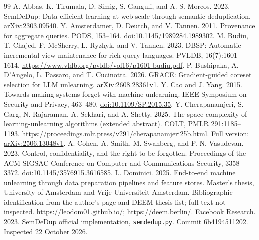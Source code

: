 \begin{thebibliography}{99}
 A. Abbas, K. Tirumala, D. Simig, S. Ganguli, and A. S.
Morcos. 2023. SemDeDup: Data-efficient learning at web-scale through
semantic deduplication. \href{https://arxiv.org/abs/2303.09540}{arXiv:2303.09540}.
 Y. Amsterdamer, D. Deutch, and V. Tannen. 2011.
Provenance for aggregate queries. PODS, 153--164.
\href{https://doi.org/10.1145/1989284.1989302}{doi:10.1145/1989284.1989302}.
 M. Budiu, T. Chajed, F. McSherry, L. Ryzhyk, and V. Tannen.
2023. DBSP: Automatic incremental view maintenance for rich query
languages. PVLDB, 16(7):1601--1614.
\url{https://www.vldb.org/pvldb/vol16/p1601-budiu.pdf}.
 P. Bushipaka, A. D'Angelo, L. Passaro, and T. Cucinotta.
2026. GRACE: Gradient-guided coreset selection for LLM unlearning.
\href{https://arxiv.org/abs/2608.28361v1}{arXiv:2608.28361v1}.
 Y. Cao and J. Yang. 2015.
Towards making systems forget with machine unlearning.
IEEE Symposium on Security and Privacy, 463--480.
\href{https://doi.org/10.1109/SP.2015.35}{doi:10.1109/SP.2015.35}.
 Y. Cherapanamjeri, S. Garg, N. Rajaraman, A. Sekhari,
and A. Shetty. 2025. The space complexity of learning-unlearning
algorithms (extended abstract). COLT, PMLR 291:1185--1193.
\url{https://proceedings.mlr.press/v291/cherapanamjeri25b.html}.
Full version: \href{https://arxiv.org/abs/2506.13048v1}{arXiv:2506.13048v1}.
 A. Cohen, A. Smith, M. Swanberg,
and P. N. Vasudevan. 2023. Control, confidentiality, and the right to be forgotten.
Proceedings of the ACM SIGSAC Conference on Computer and Communications Security,
3358--3372. \href{https://doi.org/10.1145/3576915.3616585}{doi:10.1145/3576915.3616585}.
 L. Dominici. 2025. End-to-end machine unlearning through
data preparation pipelines and feature stores. Master's thesis, University
of Amsterdam and Vrije Universiteit Amsterdam. Bibliographic identification
from the author's page and DEEM thesis list; full text not inspected.
\url{https://leodom01.github.io/}; \url{https://deem.berlin/}.
 Facebook Research. 2023.
SemDeDup official implementation, \texttt{semdedup.py}.
Commit \href{https://github.com/facebookresearch/SemDeDup/blob/6b4194511202c29b0e1ac8c730996777449ea2a4/semdedup.py}{6b4194511202}. Inspected 22 October 2026.

\end{thebibliography}
